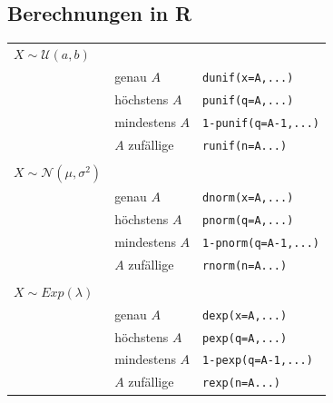 \subsection{Berechnungen in R}

\begin{table}[h!]
	\begin{tabular}{l l l}
	$X \sim \mathcal{U}(a,b)$ & & \\ %
		& genau $A$ 		& \verb!dunif(x=A,...)! \\
		& höchstens $A$		& \verb!punif(q=A,...)! \\
		& mindestens $A$	& \verb!1-punif(q=A-1,...)! \\
		& $A$ zufällige 	& \verb!runif(n=A...)! \\
	& & \\
	$X \sim \mathcal{N}(\mu, \sigma^2)$ & & \\ %
		& genau $A$		& \verb!dnorm(x=A,...)! \\
		& höchstens $A$		& \verb!pnorm(q=A,...)! \\
		& mindestens $A$	& \verb!1-pnorm(q=A-1,...)! \\
		& $A$ zufällige 	& \verb!rnorm(n=A...)! \\
	& & \\
	$X \sim Exp(\lambda)$ & & \\ %
		& genau $A$		& \verb!dexp(x=A,...)! \\
		& höchstens $A$		& \verb!pexp(q=A,...)! \\
		& mindestens $A$	& \verb!1-pexp(q=A-1,...)! \\
		& $A$ zufällige 	& \verb!rexp(n=A...)! \\
	\end{tabular}
\end{table}
